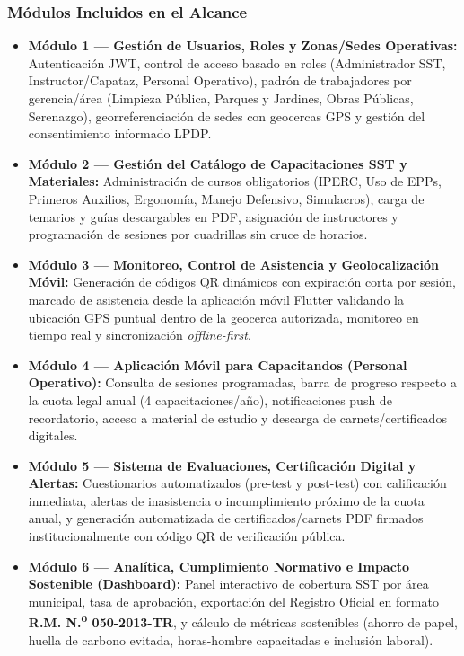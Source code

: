 \documentclass[11pt,a4paper]{article}
\begin{document}
\subsubsection*{Módulos Incluidos en el Alcance}
\begin{itemize}[leftmargin=1.5em, itemsep=0.25em]
    \item \textbf{Módulo 1 --- Gestión de Usuarios, Roles y Zonas/Sedes Operativas:} Autenticación JWT, control de acceso basado en roles (Administrador SST, Instructor/Capataz, Personal Operativo), padrón de trabajadores por gerencia/área (Limpieza Pública, Parques y Jardines, Obras Públicas, Serenazgo), georreferenciación de sedes con geocercas GPS y gestión del consentimiento informado LPDP.
    \item \textbf{Módulo 2 --- Gestión del Catálogo de Capacitaciones SST y Materiales:} Administración de cursos obligatorios (IPERC, Uso de EPPs, Primeros Auxilios, Ergonomía, Manejo Defensivo, Simulacros), carga de temarios y guías descargables en PDF, asignación de instructores y programación de sesiones por cuadrillas sin cruce de horarios.
    \item \textbf{Módulo 3 --- Monitoreo, Control de Asistencia y Geolocalización Móvil:} Generación de códigos QR dinámicos con expiración corta por sesión, marcado de asistencia desde la aplicación móvil Flutter validando la ubicación GPS puntual dentro de la geocerca autorizada, monitoreo en tiempo real y sincronización \textit{offline-first}.
    \item \textbf{Módulo 4 --- Aplicación Móvil para Capacitandos (Personal Operativo):} Consulta de sesiones programadas, barra de progreso respecto a la cuota legal anual (4 capacitaciones/año), notificaciones push de recordatorio, acceso a material de estudio y descarga de carnets/certificados digitales.
    \item \textbf{Módulo 5 --- Sistema de Evaluaciones, Certificación Digital y Alertas:} Cuestionarios automatizados (pre-test y post-test) con calificación inmediata, alertas de inasistencia o incumplimiento próximo de la cuota anual, y generación automatizada de certificados/carnets PDF firmados institucionalmente con código QR de verificación pública.
    \item \textbf{Módulo 6 --- Analítica, Cumplimiento Normativo e Impacto Sostenible (Dashboard):} Panel interactivo de cobertura SST por área municipal, tasa de aprobación, exportación del Registro Oficial en formato \textbf{R.M. N.\textsuperscript{o} 050-2013-TR}, y cálculo de métricas sostenibles (ahorro de papel, huella de carbono evitada, horas-hombre capacitadas e inclusión laboral).
\end{itemize}
\end{document}
